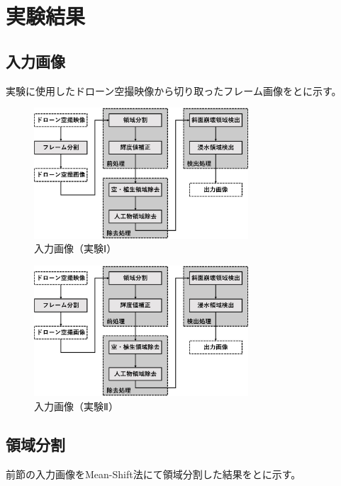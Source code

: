\documentclass[../Thesis]{subfiles}
\begin{document}
\section{実験結果}
\subsection{入力画像}
実験に使用したドローン空撮映像から切り取ったフレーム画像をとに示す。

\begin{figure}[h]
	\centering
	\includegraphics[width=8cm]{img/howto3.jpg}
	\caption{入力画像（実験Ⅰ）}
	\label{img01}
\end{figure}

\begin{figure}[h]
	\centering
	\includegraphics[width=8cm]{img/howto3.jpg}
	\caption{入力画像（実験Ⅱ）}
	\label{img01}
\end{figure}


\subsection{領域分割}
前節の入力画像をMean-Shift法にて領域分割した結果をとに示す。
\end{document}
